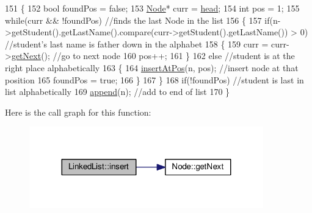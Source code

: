 \begin{DoxyCode}
151 \{
152    \textcolor{keywordtype}{bool} foundPos = \textcolor{keyword}{false};
153    \hyperlink{classNode}{Node}* curr = \hyperlink{classLinkedList_a35e09287e2d2943707b011208e7a8ed2}{head};
154    \textcolor{keywordtype}{int} pos = 1;
155    \textcolor{keywordflow}{while}(curr && !foundPos) \textcolor{comment}{//finds the last Node in the list                                              
                                                                                                       }
156    \{
157       \textcolor{keywordflow}{if}(n->getStudent().getLastName().compare(curr->getStudent().getLastName()) > 0) \textcolor{comment}{//student's last name
       is father down in the alphabet                                                                  }
158       \{
159          curr = curr->\hyperlink{classNode_af8f2d178f274dd254e6e1965971f0fd0}{getNext}(); \textcolor{comment}{//go to next node                                                  
                                                                                                              }
160          pos++;
161       \}
162       \textcolor{keywordflow}{else} \textcolor{comment}{//student is at the right place alphabetically                                                  
                                                                                                       }
163       \{
164          \hyperlink{classLinkedList_aa7b12c5f9bb22be91012d68c9da0b431}{insertAtPos}(n, pos); \textcolor{comment}{//insert node at that position                                    
                                                                                                                  }
165          foundPos = \textcolor{keyword}{true};
166       \}
167    \}
168    \textcolor{keywordflow}{if}(!foundPos) \textcolor{comment}{//student is last in list alphabetically                                                  
                                                                                                       }
169       \hyperlink{classLinkedList_ac2f92598858e9ba02af8722fba803c53}{append}(n); \textcolor{comment}{//add to end of list                                                                
                                                                                                             }
170 \}
\end{DoxyCode}


Here is the call graph for this function\+:
\nopagebreak
\begin{figure}[H]
\begin{center}
\leavevmode
\includegraphics[width=287pt]{classLinkedList_a718246359a2199be67212703be951071_cgraph}
\end{center}
\end{figure}


